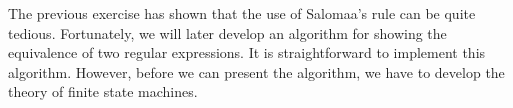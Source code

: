 \remarkEng
The previous exercise has shown that the use of Salomaa's rule can be quite tedious.  Fortunately,
we will later develop an algorithm for showing the equivalence of two regular expressions.  It is
straightforward to implement this algorithm.  However, before we can present the algorithm, we have
to develop the theory of finite state machines. 

